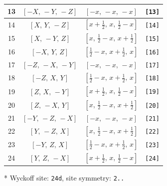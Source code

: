 \documentclass[fleqn,8pt]{jsarticle}
\begin{document}
\begin{longtable}{cccc}
13 & $\left[ - X,\, - Y,\, - Z \right]$ & $\left[ - x,\, - x,\, - x \right]$ & {\tt [13]} \\ \hline
14 & $\left[ X,\, Y,\, - Z \right]$ & $\left[ x + \frac{1}{2},\, x,\, \frac{1}{2} - x \right]$ & {\tt [14]} \\ \hline
15 & $\left[ X,\, - Y,\, Z \right]$ & $\left[ x,\, \frac{1}{2} - x,\, x + \frac{1}{2} \right]$ & {\tt [15]} \\ \hline
16 & $\left[ - X,\, Y,\, Z \right]$ & $\left[ \frac{1}{2} - x,\, x + \frac{1}{2},\, x \right]$ & {\tt [16]} \\ \hline
17 & $\left[ - Z,\, - X,\, - Y \right]$ & $\left[ - x,\, - x,\, - x \right]$ & {\tt [17]} \\ \hline
18 & $\left[ - Z,\, X,\, Y \right]$ & $\left[ \frac{1}{2} - x,\, x + \frac{1}{2},\, x \right]$ & {\tt [18]} \\ \hline
19 & $\left[ Z,\, X,\, - Y \right]$ & $\left[ x + \frac{1}{2},\, x,\, \frac{1}{2} - x \right]$ & {\tt [19]} \\ \hline
20 & $\left[ Z,\, - X,\, Y \right]$ & $\left[ x,\, \frac{1}{2} - x,\, x + \frac{1}{2} \right]$ & {\tt [20]} \\ \hline
21 & $\left[ - Y,\, - Z,\, - X \right]$ & $\left[ - x,\, - x,\, - x \right]$ & {\tt [21]} \\ \hline
22 & $\left[ Y,\, - Z,\, X \right]$ & $\left[ x,\, \frac{1}{2} - x,\, x + \frac{1}{2} \right]$ & {\tt [22]} \\ \hline
23 & $\left[ - Y,\, Z,\, X \right]$ & $\left[ \frac{1}{2} - x,\, x + \frac{1}{2},\, x \right]$ & {\tt [23]} \\ \hline
24 & $\left[ Y,\, Z,\, - X \right]$ & $\left[ x + \frac{1}{2},\, x,\, \frac{1}{2} - x \right]$ & {\tt [24]} \\
\end{longtable}
* Wyckoff site: {\tt 24d}, site symmetry: {\tt 2..}
\renewcommand{\arraystretch}{1.2}
\end{document}

